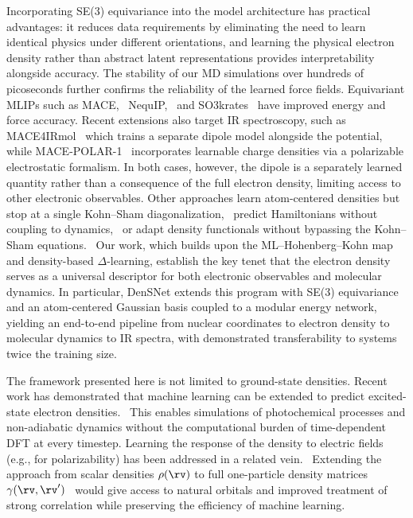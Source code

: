 \documentclass[12pt]{article}
\begin{document}
Incorporating SE(3) equivariance into the model architecture has practical advantages: it reduces data requirements by eliminating the need to learn identical physics under different orientations, and learning the physical electron density rather than abstract latent representations provides interpretability alongside accuracy. 
The stability of our MD simulations over hundreds of picoseconds further confirms the reliability of the learned force fields.
Equivariant MLIPs such as MACE,~\cite{batatia2022mace} NequIP,~\cite{batzner2021nequip} and SO3krates~\cite{frank2022so3krates,frank2024euclidean,kabylda2025so3lr} have improved energy and force accuracy. 
Recent extensions also target IR spectroscopy, such as MACE4IRmol~\cite{bhatia2025mace4ir} which trains a separate dipole model alongside the potential, while MACE-POLAR-1~\cite{batatia2026macepolar} incorporates learnable charge densities via a polarizable electrostatic formalism. In both cases, however, the dipole is a separately learned quantity rather than a consequence of the full electron density, limiting access to other electronic observables. Other approaches learn atom-centered densities but stop at a single Kohn--Sham diagonalization,~\cite{grisafi2022electronic,rackers2022cracking} predict Hamiltonians without coupling to dynamics,~\cite{kaniselvan2025helm} or adapt density functionals without bypassing the Kohn--Sham equations.~\cite{khan2025adapting} 
Our work, which builds upon the ML--Hohenberg--Kohn map~\cite{brockherde2017bypassing} and density-based $\Delta$-learning,\cite{bogojeski2020quantum,shao2023machine} establish the key tenet that the electron density serves as a universal descriptor for both electronic observables and molecular dynamics. In particular, DenSNet extends this program with SE(3) equivariance and an atom-centered Gaussian basis coupled to a modular energy network, yielding an end-to-end pipeline from nuclear coordinates to electron density to molecular dynamics to IR spectra, with demonstrated transferability to systems twice the training size.

The framework presented here is not limited to ground-state densities. Recent work has demonstrated that machine learning can be extended to predict excited-state electron densities.~\cite{bai2022machine} This enables simulations of photochemical processes and non-adiabatic dynamics without the computational burden of time-dependent DFT at every timestep. Learning the response of the density to electric fields (e.g., for polarizability) has been addressed in a related vein.~\cite{lewis2025electrostatic} Extending the approach from scalar densities $\rho(\rv)$ to full one-particle density matrices $\gamma(\rv, \rv')$~\cite{shao2023machine} would give access to natural orbitals and improved treatment of strong correlation while preserving the efficiency of machine learning.
\end{document}
